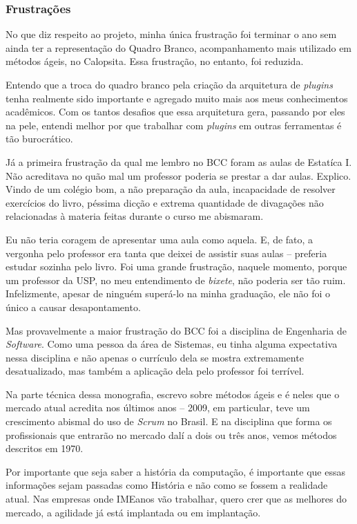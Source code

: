\documentclass[titlepage,a4paper]{article}
\newcommand{\calopsita}{Calopsita}
\begin{document}
\subsubsection*{Frustrações}

No que diz respeito ao projeto, minha única frustração foi terminar o ano sem ainda ter a representação do Quadro Branco, acompanhamento mais utilizado em métodos ágeis, no \calopsita{}. Essa frustração, no entanto, foi reduzida.

Entendo que a troca do quadro branco pela criação da arquitetura de \textit{plugins} tenha realmente sido importante e agregado muito mais aos meus conhecimentos acadêmicos. Com os tantos desafios que essa arquitetura gera, passando por eles na pele, entendi melhor por que trabalhar com \textit{plugins} em outras ferramentas é tão burocrático. 

Já a primeira frustração da qual me lembro no BCC foram as aulas de Estatíca I. Não acreditava no quão mal um professor poderia se prestar a dar aulas. Explico. Vindo de um colégio bom, a não preparação da aula, incapacidade de resolver exercícios do livro, péssima dicção e extrema quantidade de divagações não relacionadas à materia feitas durante o curso me abismaram. 

Eu não teria coragem de apresentar uma aula como aquela. E, de fato, a vergonha pelo professor era tanta que deixei de assistir suas aulas -- preferia estudar sozinha pelo livro. Foi uma grande frustração, naquele momento, porque um professor da USP, no meu entendimento de \textit{bixete}, não poderia ser tão ruim. Infelizmente, apesar de ninguém superá-lo na minha graduação, ele não foi o único a causar desapontamento.

Mas provavelmente a maior frustração do BCC foi a disciplina de Engenharia de \textit{Software}. Como uma pessoa da área de Sistemas, eu tinha alguma expectativa nessa disciplina e não apenas o currículo dela se mostra extremamente desatualizado, mas também a aplicação dela pelo professor foi terrível.

Na parte técnica dessa monografia, escrevo sobre métodos ágeis e é neles que o mercado atual acredita nos últimos anos -- 2009, em particular, teve um crescimento abismal do uso de \textit{Scrum} no Brasil. E na disciplina que forma os profissionais que entrarão no mercado dalí a dois ou três anos, vemos métodos descritos em 1970.

Por importante que seja saber a história da computação, é importante que essas informações sejam passadas como História e não como se fossem a realidade atual. Nas empresas onde IMEanos vão trabalhar, quero crer que as melhores do mercado, a agilidade já está implantada ou em implantação.
\end{document}
